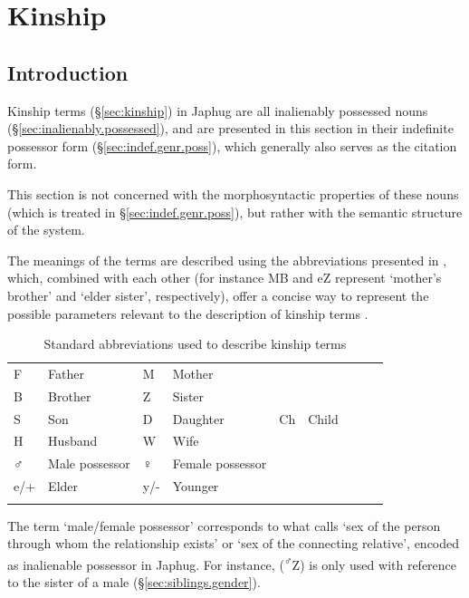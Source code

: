 \chapter{Kinship} \label{chap:kinship}

\section{Introduction}
Kinship terms (§\ref{sec:kinship}) in Japhug are all inalienably possessed nouns (§\ref{sec:inalienably.possessed}), and are presented in this section in their indefinite possessor form (§\ref{sec:indef.genr.poss}), which generally also serves as the citation form.

This section is not concerned with the morphosyntactic properties of these nouns (which is treated in §\ref{sec:indef.genr.poss}), but rather with the semantic structure of the system. 

The meanings of the terms are described using the abbreviations presented in , which, combined with each other (for instance MB and  eZ represent `mother's brother' and  `elder sister', respectively), offer a concise way to represent the possible parameters relevant to the description of kinship terms \citep{kroeber1909classificatory}. 

 
\begin{table}
\caption{Standard abbreviations used to describe kinship terms} \label{tab:kinship.abb}
\begin{tabular}{llXllXlll}
\lsptoprule
F & Father & M & Mother \\
B & Brother & Z & Sister \\
S & Son & D & Daughter & Ch & Child \\
H & Husband & W & Wife \\
♂  & Male possessor & ♀& Female possessor \\
e/+ & Elder & y/- & Younger \\
\lspbottomrule
\end{tabular}
\end{table}

The term `male/female possessor' corresponds to what \citet[78--79]{kroeber1909classificatory} calls `sex of the person through whom the relationship exists' or `sex of the connecting relative', encoded as inalienable possessor in Japhug. For instance,  (\textsuperscript{♂}Z) is only used with reference to the sister of a male (§\ref{sec:siblings.gender}).

